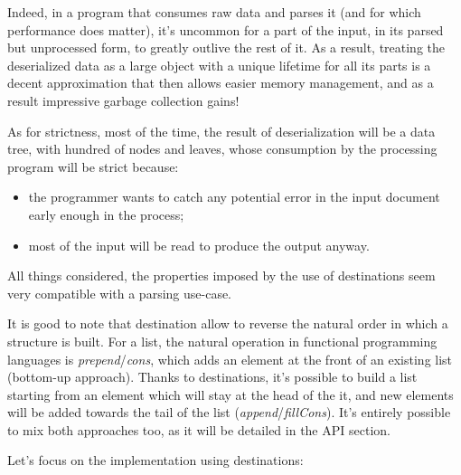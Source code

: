 \documentclass[english]{jflart}
\begin{document}
Indeed, in a program that consumes raw data and parses it (and for which performance does matter), it's uncommon for a part of the input, in its parsed but unprocessed form, to greatly outlive the rest of it. As a result, treating the deserialized data as a large object with a unique lifetime for all its parts is a decent approximation that then allows easier memory management, and as a result impressive garbage collection gains!

As for strictness, most of the time, the result of deserialization will be a data tree, with hundred of nodes and leaves, whose consumption by the processing program will be strict because:
\begin{itemize}
  \item the programmer wants to catch any potential error in the input document early enough in the process;
  \item most of the input will be read to produce the output anyway.
\end{itemize}

All things considered, the properties imposed by the use of destinations seem very compatible with a parsing use-case.

It is good to note that destination allow to reverse the natural order in which a structure is built. For a list, the natural operation in functional programming languages is \emph{prepend}/\emph{cons}, which adds an element at the front of an existing list (bottom-up approach). Thanks to destinations, it's possible to build a list starting from an element which will stay at the head of the it, and new elements will be added towards the tail of the list (\emph{append}/\emph{fillCons}). It's entirely possible to mix both approaches too, as it will be detailed in the API section.

Let's focus on the implementation using destinations:

\newcommand{\mnew}[1]{\colorbox{green}{#1}}
\newcommand{\mold}[1]{\colorbox{red}{\sout{#1}}}
\end{document}
